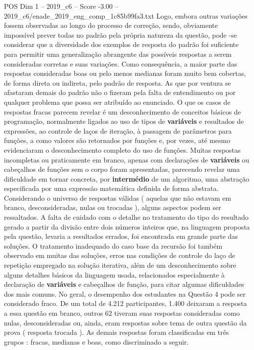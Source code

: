 \begin{textsample}{POS Dim 1 – 2019\_c6 – Score -3.00 – 2019\_c6/enade\_2019\_eng\_comp\_1c85b99fa3.txt}
Logo, embora outras variações fossem observadas ao longo do processo de correção, sendo, obviamente impossível prever todas no padrão pela própria natureza da questão, pode -se considerar que a diversidade dos exemplos de resposta do padrão foi suficiente para permitir uma generalização abrangente das possíveis respostas a serem consideradas corretas e suas variações.
Como consequência, a maior parte das respostas consideradas boas ou pelo menos medianas foram muito bem cobertas, de forma direta ou indireta, pelo padrão de resposta.
As que por ventura se afastaram demais do padrão não o fizeram pela falta de entendimento ou por qualquer problema que possa ser atribuído ao enunciado.
O que os casos de respostas fracas parecem revelar é um desconhecimento de conceitos básicos de programação, normalmente ligados ao uso de tipos de \textbf{variáveis} e resultados de expressões, ao controle de laços de iteração, à passagem de parâmetros para funções, a como valores são retornados por funções e, por vezes, até mesmo evidenciaram o desconhecimento completo do uso de funções.
Muitas respostas incompletas ou praticamente em branco, apenas com declarações de \textbf{variáveis} ou cabeçalhos de funções sem o corpo foram apresentadas, parecendo revelar uma dificuldade em tornar concreta, por \textbf{intermédio} de um algoritmo, uma abstração especificada por uma expressão matemática definida de forma abstrata.
Considerando o universo de respostas válidas ( aquelas que não estavam em branco, desconsideradas, nulas ou trocadas ), alguns aspectos podem ser ressaltados.
A falta de cuidado com o detalhe no tratamento do tipo do resultado gerado a partir da divisão entre dois números inteiros que, na linguagem proposta pela questão, levaria a resultados errados, foi encontrada em grande parte das soluções.
O tratamento inadequado do caso base da recursão foi também observado em muitas das soluções, erros nas condições de controle do laço de repetição empregado na solução iterativa, além de um desconhecimento sobre alguns detalhes básicos da linguagem usada, relacionados especialmente à declaração de \textbf{variáveis} e cabeçalhos de função, para citar algumas dificuldades dos mais comuns.
No geral, o desempenho dos estudantes na Questão 4 pode ser considerado fraco.
De um total de 4.212 participantes, 1.400 deixaram a resposta a essa questão em branco, outros 62 tiveram suas respostas consideradas como nulas, desconsideradas ou, ainda, eram respostas sobre tema de outra questão da prova ( resposta trocada ).
As demais respostas foram classificadas em três grupos : fracas, medianas e boas, como discriminado a seguir.

\end{textsample}
